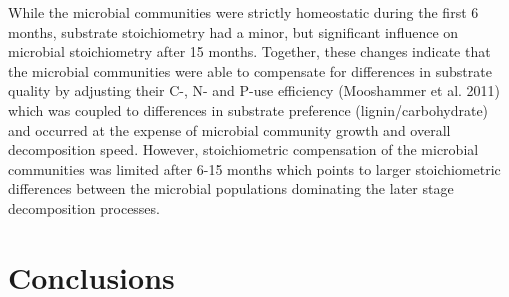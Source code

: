 While the microbial communities were strictly homeostatic during the first 6 months, substrate stoichiometry had a minor, but significant influence on microbial stoichiometry after 15 months. Together, these changes indicate that the microbial communities were able to compensate for differences in substrate quality by adjusting their C-, N- and P-use efficiency (Mooshammer et al. 2011) which was coupled to differences in substrate preference (lignin/carbohydrate) and occurred at the expense of microbial community growth and overall decomposition speed. However, stoichiometric compensation of the microbial communities was limited after 6-15 months which points to larger stoichiometric differences between the microbial populations dominating the later stage decomposition processes.


\section*{Conclusions}

